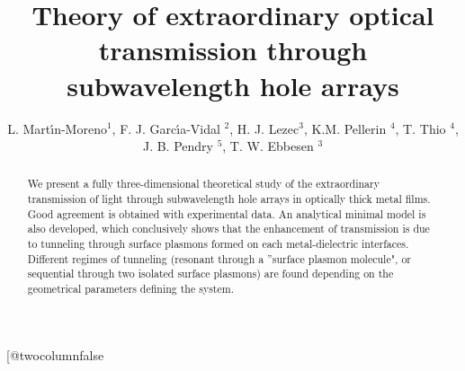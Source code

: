 




\twocolumn[\hsize\textwidth\columnwidth\hsize\csname @twocolumnfalse\endcsname


\draft

\title{ {\bf 
Theory of extraordinary optical transmission through
subwavelength hole arrays }} 

\author{L. Mart\'{\i}n-Moreno$^1$, F. J. Garc\'{\i}a-Vidal $^2$,
H. J. Lezec$^3$, K.M. Pellerin $^4$, T. Thio $^4$,
 J. B. Pendry $^5$, T. W. Ebbesen $^3$ \\} 

\address{
$^1$ {\it Departamento de F\'{\i}sica de la Materia Condensada,
ICMA-CSIC,
Universidad de Zaragoza, E-50015 Zaragoza, Spain.} \\
$^2${\it Departamento de F{\'{\i}}sica Te\'orica
de la Materia Condensada,
 Universidad Aut\'onoma de Madrid,
 E-28049 Madrid, Spain} \\
$^3$ {\it ISIS, Universit\'e Louis Pasteur, 67000 Strasbourg, France}
\\
$^4$ {\it NEC Research Institute, Princeton, New Yersey 08540, USA} \\
$^5$ {\it The Blackett Laboratory, Imperial College, London SW7 2BZ, United
Kingdom} \\
}
\maketitle
\begin{abstract}
We present a fully three-dimensional theoretical study of the 
extraordinary transmission of light through  subwavelength hole arrays 
in optically thick metal films. Good agreement is obtained with
experimental data. An analytical minimal model is also developed, which
conclusively shows that the enhancement of transmission
is due to tunneling through 
surface plasmons formed on each metal-dielectric interfaces. 
Different regimes of tunneling (resonant through a ''surface plasmon
molecule", or sequential through two isolated surface plasmons) 
are found depending on the geometrical parameters 
defining the system.

\end{abstract}


